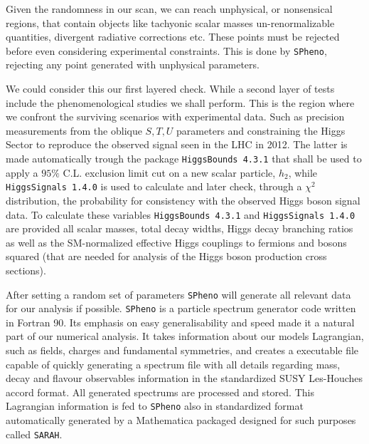 Given the randomness in our scan, we can reach unphysical, or nonsensical regions, that contain objects like tachyonic scalar masses\Joaoadd{,} un-renormalizable quantities, divergent radiative corrections etc. These points must be rejected before even considering experimental constraints. This is done by \texttt{SPheno}, rejecting any point generated with unphysical parameters. 

We could consider this our first layered check. While a second layer of tests include the phenomenological studies we shall perform. This is the region where we confront the surviving scenarios with experimental data. Such as precision measurements from the oblique $S,T,U$ parameters and constraining the Higgs Sector to reproduce the observed signal seen in the LHC in 2012. 
%
The latter is made automatically trough the package \texttt{HiggsBounds 4.3.1} that shall be used to apply a $95\%$ C.L. exclusion limit cut on a new scalar particle, $h_2$, while \texttt{HiggsSignals 1.4.0} is used to calculate and later check, through a $\chi^2$ distribution, the probability for consistency with the observed Higgs boson signal data. 
% 
To calculate these variables \texttt{HiggsBounds 4.3.1} and \texttt{HiggsSignals 1.4.0} are provided all scalar masses, total decay widths, Higgs decay branching ratios as well as the SM-normalized effective Higgs couplings to fermions and bosons squared (that are needed for analysis of the Higgs boson production cross sections). %
%
%

After setting a random set of parameters \texttt{SPheno} will generate all relevant data for our analysis if possible. 
\texttt{SPheno} is a particle spectrum generator code written in Fortran 90. Its emphasis on easy generalisability and speed made it a natural part of our numerical analysis. It takes information about our models Lagrangian, such as fields, charges and fundamental symmetries, and creates a executable file capable of quickly generating a spectrum file with all details regarding mass, decay and flavour observables information in the standardized SUSY Les-Houches accord format. All generated spectrums are processed and stored. 
%
This Lagrangian information is fed to \texttt{SPheno} also in standardized format automatically generated by a Mathematica packaged designed for such purposes called \texttt{SARAH}.  

